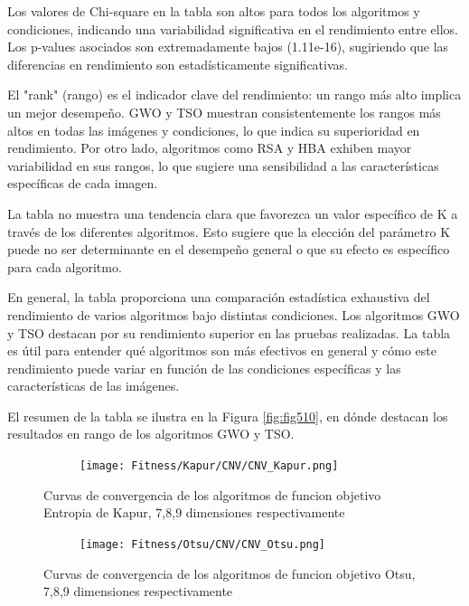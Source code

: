 \documentclass[conference]{IEEEtran}
\begin{document}
\noindent Los valores de Chi-square en la tabla son altos para todos los algoritmos y condiciones, indicando una variabilidad significativa en el rendimiento entre ellos. Los p-values asociados son extremadamente bajos (1.11e-16), sugiriendo que las diferencias en rendimiento son estadísticamente significativas.

\noindent El "rank" (rango) es el indicador clave del rendimiento: un rango más alto implica un mejor desempeño. GWO y TSO muestran consistentemente los rangos más altos en todas las imágenes y condiciones, lo que indica su superioridad en rendimiento. Por otro lado, algoritmos como RSA y HBA exhiben mayor variabilidad en sus rangos, lo que sugiere una sensibilidad a las características específicas de cada imagen.

\noindent La tabla no muestra una tendencia clara que favorezca un valor específico de K a través de los diferentes algoritmos. Esto sugiere que la elección del parámetro K puede no ser determinante en el desempeño general o que su efecto es específico para cada algoritmo.

\noindent En general, la tabla proporciona una comparación estadística exhaustiva del rendimiento de varios algoritmos bajo distintas condiciones. Los algoritmos GWO y TSO destacan por su rendimiento superior en las pruebas realizadas. La tabla es útil para entender qué algoritmos son más efectivos en general y cómo este rendimiento puede variar en función de las condiciones específicas y las características de las imágenes.

\noindent El resumen de la tabla se ilustra en la Figura \ref{fig:fig510}, en dónde destacan los resultados en rango de los algoritmos GWO y TSO.


\begin{figure}
	\centering
	\begin{subfigure}{0.5\textwidth}
		\texttt{[image: Fitness/Kapur/CNV/CNV\_Kapur.png]}
	\end{subfigure}
	\caption{Curvas de convergencia de los algoritmos de funcion objetivo Entropia de Kapur, 7,8,9 dimensiones respectivamente}
	\label{fig:imagenes}    
\end{figure}


\begin{figure}
	\centering
	\begin{subfigure}{0.5\textwidth}
		\texttt{[image: Fitness/Otsu/CNV/CNV\_Otsu.png]}
	\end{subfigure}
	\caption{Curvas de convergencia de los algoritmos de funcion objetivo Otsu, 7,8,9 dimensiones respectivamente}
	\label{fig:imagenes}    
\end{figure}
\end{document}
